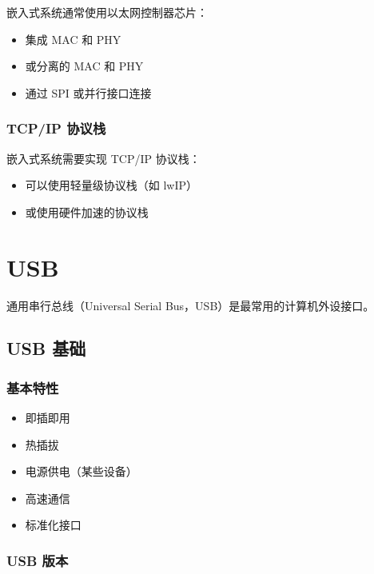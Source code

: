 嵌入式系统通常使用以太网控制器芯片：
\begin{itemize}
  \item 集成 MAC 和 PHY
  \item 或分离的 MAC 和 PHY
  \item 通过 SPI 或并行接口连接
\end{itemize}

\subsubsection{TCP/IP 协议栈}

嵌入式系统需要实现 TCP/IP 协议栈：
\begin{itemize}
  \item 可以使用轻量级协议栈（如 lwIP）
  \item 或使用硬件加速的协议栈
\end{itemize}

\section{USB}

通用串行总线（Universal Serial Bus，USB）是最常用的计算机外设接口。

\subsection{USB 基础}

\subsubsection{基本特性}

\begin{itemize}
  \item 即插即用
  \item 热插拔
  \item 电源供电（某些设备）
  \item 高速通信
  \item 标准化接口
\end{itemize}

\subsubsection{USB 版本}

